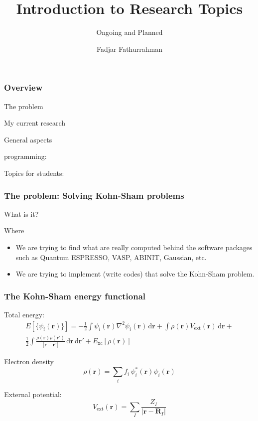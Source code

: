 \documentclass[english,9pt]{beamer}
\begin{document}
\title{Introduction to Research Topics}
\subtitle{Ongoing and Planned}
\author{Fadjar Fathurrahman}
\date{}


\frame{\titlepage}


\begin{frame}
\frametitle{Overview}

The problem

My current research

General aspects

programming:

Topics for students:


\end{frame}


\begin{frame}
\frametitle{The problem: Solving Kohn-Sham problems}

What is it? 

Where 
\begin{itemize}
\item We are trying to find what are really computed behind the software packages such
 as Quantum ESPRESSO, VASP, ABINIT, Gaussian, etc.
\item We are trying to implement (write codes) that solve the Kohn-Sham problem.
\end{itemize}

\end{frame}


\begin{frame}
\frametitle{The Kohn-Sham energy functional}

Total energy:
\begin{eqnarray}
E\left[\{\psi_{i}(\mathbf{r})\}\right] =
-\frac{1}{2} \int \psi_{i}(\mathbf{r}) \nabla^{2} \psi_{i}(\mathbf{r})\,\mathrm{d}\mathbf{r} +
\int \rho(\mathbf{r}) V_{\mathrm{ext}}(\mathbf{r})\,\mathrm{d}\mathbf{r} + \\
\frac{1}{2}\int
\frac{\rho(\mathbf{r}) \rho(\mathbf{r}')}{\left|\mathbf{r}-\mathbf{r}'\right|}\,
\mathrm{d}\mathbf{r}\,\mathrm{d}\mathbf{r}' + E_{\mathrm{xc}}\left[\rho(\mathbf{r})\right]
\end{eqnarray}

Electron density
\begin{equation}
\rho(\mathbf{r}) = \sum_{i} f_{i}\, \psi_{i}^{*}(\mathbf{r}) \psi_{i}(\mathbf{r})
\end{equation}

External potential:
\begin{equation}
V_{\mathrm{ext}}(\mathbf{r}) = \sum_{I} \frac{Z_{I}}{\left|\mathbf{r} - \mathbf{R}_{I}\right|}
\end{equation}

\end{frame}
\end{document}

